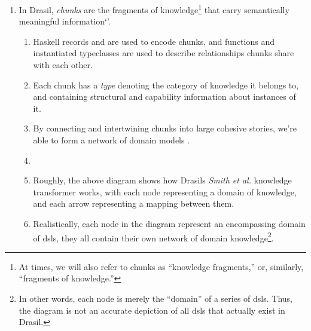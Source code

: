 \begin{enumerate}
\begin{enumerate}
                  \item Drasil relies on a \textit{network of domains} (a
                        network of domain knowledge connected by \aclp{dsl}) to
                        enable the complex information transformation needed to
                        convert an \acs{srs} document into code.

            \end{enumerate}

      \item In Drasil, \textit{chunks} are the fragments of
            knowledge\footnote{At times, we will also refer to chunks as
                  ``knowledge fragments,'' or, similarly, ``fragments of knowledge.''}
            that carry semantically meaningful information`'.
            \begin{enumerate}
                  \item Haskell records and  are used to encode
                        chunks, and functions and instantiated typeclasses are
                        used to describe relationships chunks share with each
                        other.

                  \item Each chunk has a \textit{type} denoting the category of
                        knowledge it belongs to, and containing structural and
                        capability information about instances of it.

                  \item By connecting and intertwining chunks into large
                        cohesive stories, we're able to form a network of domain
                        models \cite{Czarnecki2005}.

                  \item \roughNetworkOfDomains{}

                  \item Roughly, the above diagram shows how Drasils
                        \textit{Smith et al.} knowledge transformer works, with
                        each node representing a domain of knowledge, and each
                        arrow representing a mapping between them.

                  \item Realistically, each node in the diagram represent an
                        encompassing domain of \acsp{dsl}, they all contain
                        their own network of domain knowledge\footnote{In other
                              words, each node is merely the ``domain'' of a series of
                              \acsp{dsl}. Thus, the diagram is not an accurate
                              depiction of all \acsp{dsl} that actually exist in
                              Drasil.}.
            \end{enumerate}


\end{enumerate}
